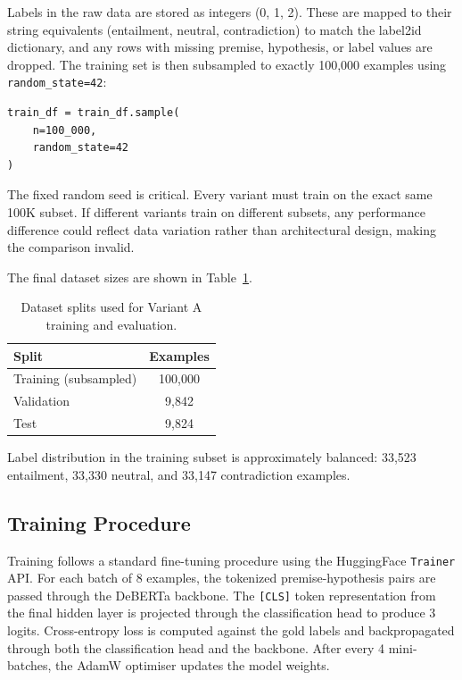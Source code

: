 Labels in the raw data are stored as integers (0, 1, 2). These are
mapped to their string equivalents (entailment, neutral, contradiction)
to match the label2id dictionary, and any rows with missing premise,
hypothesis, or label values are dropped. The training set is then
subsampled to exactly 100,000 examples using \texttt{random\_state=42}:

\begin{verbatim}
train_df = train_df.sample(
    n=100_000,
    random_state=42
)
\end{verbatim}

The fixed random seed is critical. Every variant must train on the
exact same 100K subset. If different variants train on different
subsets, any performance difference could reflect data variation rather
than architectural design, making the comparison invalid.

The final dataset sizes are shown in Table~\ref{tab:dataset_splits}.

\begin{table}[H]
\centering
\caption{Dataset splits used for Variant A training and evaluation.}
\label{tab:dataset_splits}
\begin{tabular}{lc}
\toprule
\textbf{Split} & \textbf{Examples} \\
\midrule
Training (subsampled) & 100,000 \\
Validation            & 9,842   \\
Test                  & 9,824   \\
\bottomrule
\end{tabular}
\end{table}

Label distribution in the training subset is approximately balanced:
33,523 entailment, 33,330 neutral, and 33,147 contradiction examples.

\subsection{Training Procedure}

Training follows a standard fine-tuning procedure using the
HuggingFace \texttt{Trainer} API. For each batch of 8 examples, the
tokenized premise-hypothesis pairs are passed through the DeBERTa
backbone. The \texttt{[CLS]} token representation from the final hidden
layer is projected through the classification head to produce 3 logits.
Cross-entropy loss is computed against the gold labels and
backpropagated through both the classification head and the backbone.
After every 4 mini-batches, the AdamW optimiser updates the model
weights.

